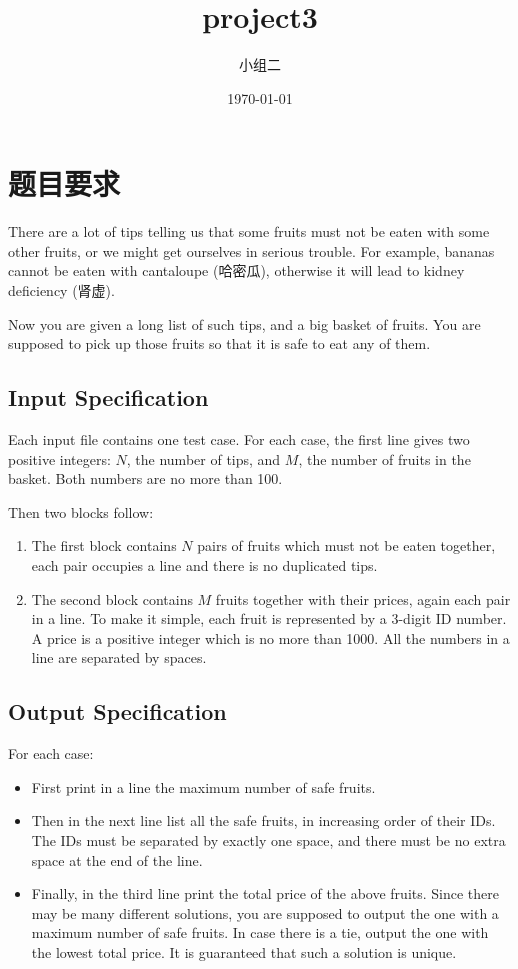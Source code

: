 \documentclass{ctexart} %
\title{project3}
\author{小组二}
\date{\today}
\begin{document}
\maketitle %

\section*{题目要求}

There are a lot of tips telling us that some fruits must not be eaten with some other fruits, or we might get ourselves in serious trouble. For example, bananas cannot be eaten with cantaloupe (哈密瓜), otherwise it will lead to kidney deficiency (肾虚).

Now you are given a long list of such tips, and a big basket of fruits. You are supposed to pick up those fruits so that it is safe to eat any of them.

\subsection*{Input Specification}
Each input file contains one test case. For each case, the first line gives two positive integers: \(N\), the number of tips, and \(M\), the number of fruits in the basket. Both numbers are no more than 100.

Then two blocks follow:
\begin{enumerate}[label=\arabic*.]
    \item The first block contains \(N\) pairs of fruits which must not be eaten together, each pair occupies a line and there is no duplicated tips.
    \item The second block contains \(M\) fruits together with their prices, again each pair in a line. To make it simple, each fruit is represented by a 3-digit ID number. A price is a positive integer which is no more than 1000. All the numbers in a line are separated by spaces.
\end{enumerate}

\subsection*{Output Specification}
For each case:
\begin{itemize}
    \item First print in a line the maximum number of safe fruits.
    \item Then in the next line list all the safe fruits, in increasing order of their IDs. The IDs must be separated by exactly one space, and there must be no extra space at the end of the line.
    \item Finally, in the third line print the total price of the above fruits. Since there may be many different solutions, you are supposed to output the one with a maximum number of safe fruits. In case there is a tie, output the one with the lowest total price. It is guaranteed that such a solution is unique.
\end{itemize}
\end{document}
